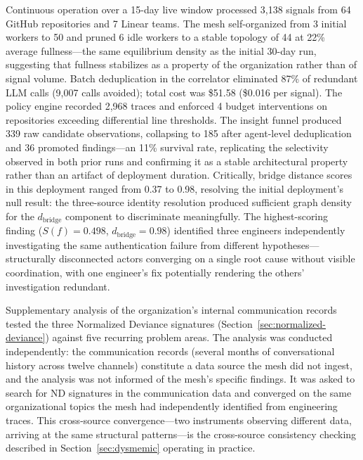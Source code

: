 \documentclass[11pt,a4paper]{article}
\begin{document}
Continuous operation over a 15-day live window processed 3,138 signals from 64 GitHub repositories and 7 Linear teams.  The mesh self-organized from 3 initial workers to 50 and pruned 6 idle workers to a stable topology of 44 at 22\% average fullness---the same equilibrium density as the initial 30-day run, suggesting that fullness stabilizes as a property of the organization rather than of signal volume.  Batch deduplication in the correlator eliminated 87\% of redundant LLM calls (9,007 calls avoided); total cost was \$51.58 (\$0.016 per signal).  The policy engine recorded 2,968 traces and enforced 4 budget interventions on repositories exceeding differential line thresholds.  The insight funnel produced 339 raw candidate observations, collapsing to 185 after agent-level deduplication and 36 promoted findings---an 11\% survival rate, replicating the selectivity observed in both prior runs and confirming it as a stable architectural property rather than an artifact of deployment duration.  Critically, bridge distance scores in this deployment ranged from 0.37 to 0.98, resolving the initial deployment's null result: the three-source identity resolution produced sufficient graph density for the $d_{\text{bridge}}$ component to discriminate meaningfully.  The highest-scoring finding ($S(f) = 0.498$, $d_{\text{bridge}} = 0.98$) identified three engineers independently investigating the same authentication failure from different hypotheses---structurally disconnected actors converging on a single root cause without visible coordination, with one engineer's fix potentially rendering the others' investigation redundant.

Supplementary analysis of the organization's internal communication records tested the three Normalized Deviance signatures (Section~\ref{sec:normalized-deviance}) against five recurring problem areas. The analysis was conducted independently: the communication records (several months of conversational history across twelve channels) constitute a data source the mesh did not ingest, and the analysis was not informed of the mesh's specific findings. It was asked to search for ND signatures in the communication data and converged on the same organizational topics the mesh had independently identified from engineering traces. This cross-source convergence---two instruments observing different data, arriving at the same structural patterns---is the cross-source consistency checking described in Section~\ref{sec:dysmemic} operating in practice.
\end{document}
